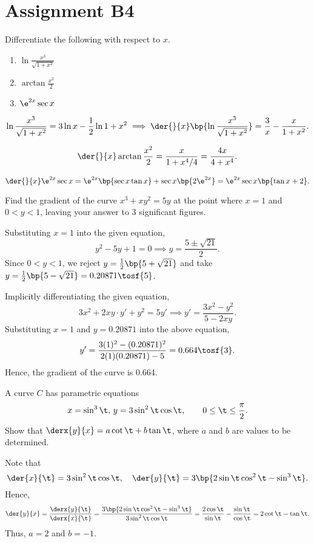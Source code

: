 \section{Assignment B4}

\begin{problem}
    Differentiate the following with respect to $x$.

    \begin{enumerate}
        \item $\ln \frac{x^3}{\sqrt{1+x^2}}$
        \item $\arctan{\frac{x^2}2}$
        \item $\e^{2x}\sec x$
    \end{enumerate}
\end{problem}
\begin{solution}
    \begin{ppart}
        \[\ln \frac{x^3}{\sqrt{1 + x^2}} = 3\ln x - \frac12 \ln{1 + x^2} \implies \der{}{x} \bp{\ln \frac{x^3}{\sqrt{1+x^2}}} = \frac3x - \frac{x}{1 + x^2}.\]
    \end{ppart}
    \begin{ppart}
        \[\der{}{x} \arctan{\frac{x^2}2} = \frac{x}{1 + x^4/4} = \frac{4x}{4 + x^4}.\]
    \end{ppart}
    \begin{ppart}
        \[\der{}{x} \e^{2x}\sec x = \e^{2x}\bp{\sec x \tan x} + \sec x \bp{2\e^{2x}} = \e^{2x} \sec x \bp{\tan x + 2}.\]
    \end{ppart}
\end{solution}

\begin{problem}
    Find the gradient of the curve $x^3 + xy^2 = 5y$ at the point where $x=1$ and $0 < y < 1$, leaving your answer to 3 significant figures.
\end{problem}
\begin{solution}
    Substituting $x=1$ into the given equation, \[y^2-5y+1 =0 \implies y = \frac{5\pm\sqrt{21}}2.\] Since $0 < y < 1$, we reject $y = \frac12 \bp{5+\sqrt{21}}$ and take $y = \frac12 \bp{5-\sqrt{21}} = 0.20871 \tosf{5}$. 
    
    Implicitly differentiating the given equation, \[3x^2 + 2xy\cdot y' + y^2 = 5y' \implies y' = \frac{3x^2 - y^2}{5 - 2xy}.\] Substituting $x=1$ and $y=0.20871$ into the above equation, \[y' = \frac{3(1)^2 - (0.20871)^2}{2(1)(0.20871) - 5} = 0.664 \tosf{3}.\] Hence, the gradient of the curve is 0.664.
\end{solution}

\begin{problem}
    A curve $C$ has parametric equations \[x = \sin^3 \t, \, y = 3 \sin^2 \t \cos \t, \qquad 0 \leq \t \leq \frac\pi2.\] Show that $\derx{y}{x} = a\cot \t + b\tan \t$, where $a$ and $b$ are values to be determined.
\end{problem}
\begin{solution}
    Note that \[\der{x}{\t} = 3\sin^2\t\cos\t, \quad \der{y}{\t} = 3\bp{2\sin\t\cos^2\t-\sin^3\t}.\] Hence, \[\der{y}{x} = \frac{\derx{y}{\t}}{\derx{x}{\t}} = \frac{3\bp{2\sin\t\cos^2\t-\sin^3\t}}{3\sin^2\t\cos\t} = \frac{2\cos\t}{\sin\t} - \frac{\sin\t}{\cos\t} = 2\cot\t - \tan\t.\] Thus, $a = 2$ and $b=-1$.
\end{solution}